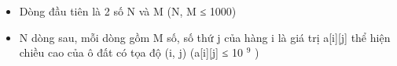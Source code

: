 \begin{itemize}
	\item Dòng đầu tiên là 2 số N và M (N, M ≤ 1000)
	\item N dòng sau, mỗi dòng gồm M số, số thứ j của hàng i là giá trị a[i][j] thể hiện chiều cao của ô đất có tọa độ (i, j) (a[i][j] ≤ 10 $^ 9 $ )
\end{itemize}
